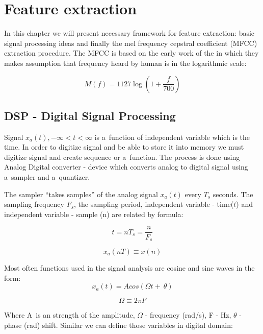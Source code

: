 \chapter{Feature extraction}

In this chapter we will present necessary framework for feature extraction: basic signal processing ideas and finally the mel frequency cepstral coefficient (MFCC) extraction procedure. The MFCC is based on the early work of the \textcite{stevens_scale_1937} in which they makes assumption that frequency heard by human is in the logarithmic scale:

\begin{equation}
	\label{eq:mel}
	M(f) = 1127\log\left(1+\frac{f}{700}\right)
\end{equation}

\section{DSP - Digital Signal Processing}

Signal $x_a(t), -\infty < t < \infty$ is a~function of independent variable which is the time. In order to digitize signal and be able to store it into memory we must digitize signal and create sequence or a~function. The process is done using Analog Digital converter - device which converts analog to digital signal using a~sampler and a~quantizer.

The sampler ``takes samples'' of the analog signal $x_a(t)$ every $T_s$ seconds. The sampling frequency $F_s$, the sampling period, independent variable - time($t$) and independent variable - sample (n) are related by formula:

\begin{equation}
	t = nT_s = \frac{n}{F_s}
\end{equation}

\begin{equation}
	x_a(nT) \equiv x(n)
\end{equation}


Most often functions used in the signal analysis are cosine and sine waves in the form:
\begin{equation}
	x_a(t) = Acos(\Omega t +~\theta)
\end{equation}

\begin{equation}
	\Omega \equiv 2\pi F
\end{equation}

Where A~is an strength of the amplitude, $\Omega$ - frequency (rad/s), F - Hz, $\theta$ - phase (rad) shift.  
Similar we can define those variables in digital domain:

